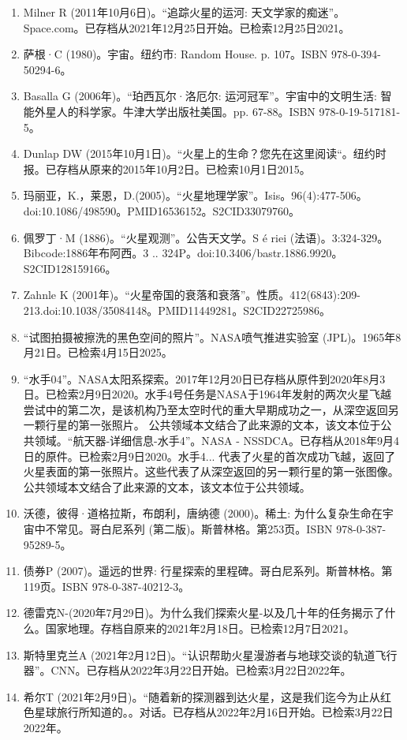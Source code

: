\begin{enumerate}
\item Milner R (2011年10月6日)。“追踪火星的运河: 天文学家的痴迷”。Space.com。已存档从2021年12月25日开始。已检索12月25日2021。
\item 萨根·C (1980)。宇宙。纽约市: Random House. p. 107。ISBN 978-0-394-50294-6。
\item Basalla G (2006年)。“珀西瓦尔·洛厄尔: 运河冠军”。宇宙中的文明生活: 智能外星人的科学家。牛津大学出版社美国。pp. 67-88。ISBN 978-0-19-517181-5。
\item Dunlap DW (2015年10月1日)。“火星上的生命？您先在这里阅读“。纽约时报。已存档从原来的2015年10月2日。已检索10月1日2015。
\item 玛丽亚，K.，莱恩，D.(2005)。“火星地理学家”。Isis。96(4):477-506。doi:10.1086/498590。PMID16536152。S2CID33079760。  
\item 佩罗丁·M (1886)。“火星观测”。公告天文学。S é riei (法语)。3:324-329。Bibcode:1886年布阿西。3 .. 324P。doi:10.3406/bastr.1886.9920。S2CID128159166。 
\item Zahnle K (2001年)。“火星帝国的衰落和衰落”。性质。412(6843):209-213.doi:10.1038/35084148。PMID11449281。S2CID22725986。  
\item “试图拍摄被擦洗的黑色空间的照片”。NASA喷气推进实验室 (JPL)。1965年8月21日。已检索4月15日2025。
\item “水手04”。NASA太阳系探索。2017年12月20日已存档从原件到2020年8月3日。已检索2月9日2020。水手4号任务是NASA于1964年发射的两次火星飞越尝试中的第二次，是该机构乃至太空时代的重大早期成功之一，从深空返回另一颗行星的第一张照片。 公共领域本文结合了此来源的文本，该文本位于公共领域。“航天器-详细信息-水手4”。NASA - NSSDCA。已存档从2018年9月4日的原件。已检索2月9日2020。水手4... 代表了火星的首次成功飞越，返回了火星表面的第一张照片。这些代表了从深空返回的另一颗行星的第一张图像。 公共领域本文结合了此来源的文本，该文本位于公共领域。
\item 沃德，彼得·道格拉斯，布朗利，唐纳德 (2000)。稀土: 为什么复杂生命在宇宙中不常见。哥白尼系列 (第二版)。斯普林格。第253页。ISBN 978-0-387-95289-5。
\item 债券P (2007)。遥远的世界: 行星探索的里程碑。哥白尼系列。斯普林格。第119页。ISBN 978-0-387-40212-3。
\item 德雷克N-(2020年7月29日)。为什么我们探索火星-以及几十年的任务揭示了什么。国家地理。存档自原来的2021年2月18日。已检索12月7日2021。
\item 斯特里克兰A (2021年2月12日)。“认识帮助火星漫游者与地球交谈的轨道飞行器”。CNN。已存档从2022年3月22日开始。已检索3月22日2022年。
\item 希尔T (2021年2月9日)。“随着新的探测器到达火星，这是我们迄今为止从红色星球旅行所知道的。。对话。已存档从2022年2月16日开始。已检索3月22日2022年。

\end{enumerate}
